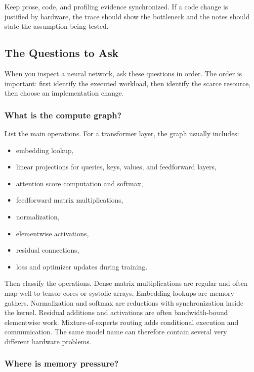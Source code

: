 \begin{aside}
Keep prose, code, and profiling evidence synchronized. If a code change is justified by hardware, the trace should show the bottleneck and the notes should state the assumption being tested.
\end{aside}

\subsection{The Questions to Ask}

When you inspect a neural network, ask these questions in order. The order is important: first identify the executed workload, then identify the scarce resource, then choose an implementation change.

\subsubsection{What is the compute graph?}

List the main operations. For a transformer layer, the graph usually includes:

\begin{itemize}[leftmargin=*]
  \item embedding lookup,
  \item linear projections for queries, keys, values, and feedforward layers,
  \item attention score computation and softmax,
  \item feedforward matrix multiplications,
  \item normalization,
  \item elementwise activations,
  \item residual connections,
  \item loss and optimizer updates during training.
\end{itemize}

Then classify the operations. Dense matrix multiplications are regular and often map well to tensor cores or systolic arrays. Embedding lookups are memory gathers. Normalization and softmax are reductions with synchronization inside the kernel. Residual additions and activations are often bandwidth-bound elementwise work. Mixture-of-experts routing adds conditional execution and communication. The same model name can therefore contain several very different hardware problems.

\subsubsection{Where is memory pressure?}

